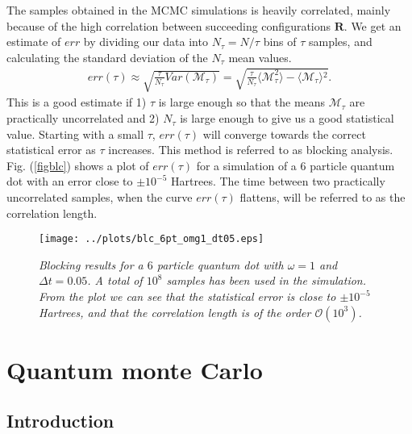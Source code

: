 \documentclass[a4paper,10pt,twocolumn]{article} %
\newcommand{\ts}[1]{\textbf{#1}}
\newcommand{\expec}[1]{\langle{}{#1}\rangle{}}
\begin{document}
The samples obtained in the MCMC simulations is heavily correlated, mainly because of the high correlation between succeeding configurations $\ts R$.
We get an estimate of $err$ by dividing our data into $N_\tau=N/\tau$ bins of $\tau$ samples, and calculating the standard deviation of the $N_\tau$ mean values. 
\begin{align}
	err(\tau)\approx\sqrt{\frac\tau{N_\tau}Var(\mathcal M_\tau)} = \sqrt{\frac{\tau}{N_\tau}\expec{\mathcal M_\tau^2}-\expec{\mathcal M_\tau}^2}.
\end{align}
This is a good estimate if 1) $\tau$ is large enough so that the means $\mathcal M_\tau$ are practically uncorrelated and 2) $N_\tau$ is large enough 
to give us a good statistical value. Starting with a small $\tau$, $err(\tau)$ will converge towards the correct statistical error as $\tau$ increases. 
This method is referred to as blocking analysis. Fig. (\ref{figblc}) shows a plot of $err(\tau)$ for a simulation of a $6$ particle quantum dot with an error
close to $\pm10^{-5}$ Hartrees. The time between two practically uncorrelated samples, when the curve $err(\tau)$ flattens, will be referred to as the correlation length.

\begin{figure}[h!]
\begin{center}
\caption{{\it%
		Blocking results for a $6$ particle quantum dot with $\omega=1$ and $\Delta t = 0.05$. A total of $10^8$ samples has been used in the simulation. From the plot we can see that
		the statistical error is close to $\pm10^{-5}$ Hartrees, and that the correlation length is of the order $\mathcal O(10^3)$.}} 
		\label{fig:timesteperror}
	\texttt{[image: ../plots/blc\_6pt\_omg1\_dt05.eps]}
\end{center}
\end{figure}


\section{Quantum monte Carlo}%

\subsection{Introduction}%
\end{document}
